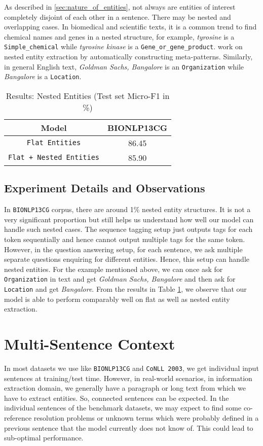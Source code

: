 As described in \ref{sec:nature_of_entities}, not always are entities of interest completely disjoint of each other in a sentence. There may be nested and overlapping cases. In biomedical and scientific texts, it is a common trend to find chemical names and genes in a nested structure, for example, \textit{tyrosine} is a \texttt{Simple\_chemical} while \textit{tyrosine kinase} is a \texttt{Gene\_or\_gene\_product}. \cite{wang2018penner} work on nested entity extraction by automatically constructing meta-patterns. Similarly, in general English text, \textit{Goldman Sachs, Bangalore} is an \texttt{Organization} while \textit{Bangalore} is a \texttt{Location}. 

\begin{table}[h!]
\centering
\begin{tabular}{|c|c|}\hline
	\textbf{Model} & \textbf{BIONLP13CG}\\\hline
	\texttt{Flat Entities} & 86.45\\\hline
	\texttt{Flat + Nested Entities} & 85.90\\\hline
	\end{tabular}
    \caption{Results: Nested Entities (Test set Micro-F1 in \%)}
    \label{tab:res_nesting}
\end{table}

\subsection{Experiment Details and Observations}

In \texttt{BIONLP13CG} corpus, there are around 1\% nested entity structures. It is not a very significant proportion but still helps us understand how well our model can handle such nested cases. The sequence tagging setup just outputs tags for each token sequentially and hence cannot output multiple tags for the same token. However, in the question answering setup, for each sentence, we ask multiple separate questions enquiring for different entities. Hence, this setup can handle nested entities. For the example mentioned above, we can once ask for \texttt{Organization} in text and get \textit{Goldman Sachs, Bangalore} and then ask for \texttt{Location} and get \textit{Bangalore}. From the results in Table \ref{tab:res_nesting}, we observe that our model is able to perform comparably well on flat as well as nested entity extraction.

\section{Multi-Sentence Context}
In most datasets we use like \texttt{BIONLP13CG} and \texttt{CoNLL 2003}, we get individual input sentences at training/test time. However, in real-world scenarios, in information extraction domain, we generally have a paragraph or long text from which we have to extract entities. So, connected sentences can be expected. In the individual sentences of the benchmark datasets, we may expect to find some co-reference resolution problems or unknown terms which were probably defined in a previous sentence that the model currently does not know of. This could lead to sub-optimal performance. 

